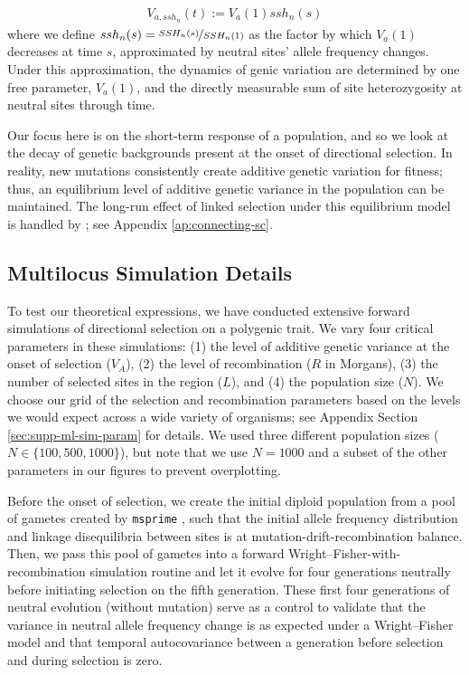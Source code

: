 \documentclass[11pt]{article}
\begin{document}
\begin{align}
  V_{a,ssh_n}(t) := V_a(1) ssh_n(s)
\end{align}
%
where we define $ssh_n(s) = \nicefrac{SSH_n(s)}{SSH_n(1)}$ as the factor by
which $V_a(1)$ decreases at time $s$, approximated by neutral sites' allele
frequency changes. Under this approximation, the dynamics of genic variation
are determined by one free parameter, $V_a(1)$, and the directly measurable sum of
site heterozygosity at neutral sites through time. 

Our focus here is on the short-term response of a population, and so we look at
the decay of genetic backgrounds present at the onset of directional selection.
In reality, new mutations consistently create additive genetic variation for
fitness; thus, an equilibrium level of additive genetic variance in the
population can be maintained. The long-run effect of linked selection under
this equilibrium model is handled by
\textcite{Santiago1995-hx,Santiago1998-bs}; see Appendix
\ref{ap:connecting-sc}.

\subsection{Multilocus Simulation Details}
\label{sec:ml-sim}

To test our theoretical expressions, we have conducted extensive forward
simulations of directional selection on a polygenic trait. We vary four
critical parameters in these simulations: (1) the level of additive genetic
variance at the onset of selection ($V_A$), (2) the level of recombination ($R$
in Morgans), (3) the number of selected sites in the region ($L$), and (4) the
population size ($N$). We choose our grid of the selection and recombination
parameters based on the levels we would expect across a wide variety of
organisms; see Appendix Section \ref{sec:supp-ml-sim-param} for details. We
used three different population sizes ($N \in \{100, 500, 1000\}$), but note
that we use $N=1000$ and a subset of the other parameters in our figures to
prevent overplotting.


Before the onset of selection, we create the initial diploid population from a
pool of gametes created by \texttt{msprime} \parencite{Kelleher2016-oi}, such
that the initial allele frequency distribution and linkage disequilibria
between sites is at mutation-drift-recombination balance. Then, we pass this
pool of gametes into a forward Wright--Fisher-with-recombination simulation
routine and let it evolve for four generations neutrally before initiating
selection on the fifth generation.  These first four generations of neutral
evolution (without mutation) serve as a control to validate that the variance
in neutral allele frequency change is as expected under a Wright--Fisher model
and that temporal autocovariance between a generation before selection and
during selection is zero.
\end{document}
